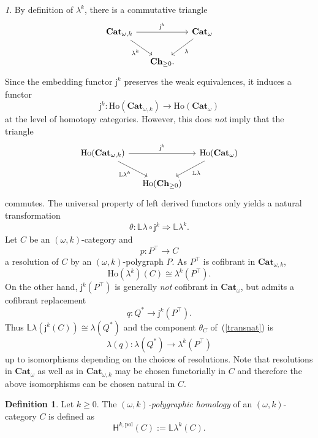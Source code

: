 \documentclass[reqno]{amsart}
\theoremstyle{plain}
\theoremstyle{definition}
\newtheorem{definition}[subsubsection]{Definition}
\theoremstyle{remark}
\newtheorem{paragr}[subsubsection]{} %
\newcommand{\pair}[2]{(#1,#2)}       %
\newcommand{\ctg}[1]{\mathbf{#1}}  %
\newcommand{\Cat}{\ctg{Cat}}   %
\newcommand{\nCat}[1]{\Cat_{#1}}  %
\newcommand{\opCat}[1]{\Cat_{\omega,#1}} %
\newcommand{\oCat}{\nCat{\omega}} %
\newcommand{\Ch}[1]{\ctg{Ch}_{#1}} %
\newcommand{\Chp}{\Ch{\geq 0}} %
\newcommand{\functor}[1]{\mathsf{#1}} %
\newcommand{\emb}[2]{\functor{j}_{#2}^{#1}}%
\newcommand{\oemb}[1]{\emb{#1}{}}%
\newcommand{\abel}{\functor{\lambda}} %
\newcommand{\abelk}[1]{\functor{\abel}^{#1}}%
\newcommand{\homnat}{\theta}%
\newcommand{\frcat}[1]{#1^*} %
\newcommand{\frgp}[1]{#1^\top} %
\newcommand{\ook}[1]{\ensuremath{\pair{\omega}{#1}}}
\newcommand{\Ho}{\functor{H}} %
\newcommand{\LL}{\mathbb{L}} %
\newcommand{\Hop}[1]{\Ho^{#1,\mathrm{pol}}} %
\newcommand{\Loc}[1]{\mathrm{Ho}(#1)} %
\newcommand{\nbd}{\nobreakdash} %
\begin{document}
\begin{paragr}\label{paragr:subtlety}
  By definition of $\abelk k$, there is a commutative triangle
  \[
    \begin{tikzcd}[column sep=small]
      \opCat{k}\ar[rr,"\oemb{k}"]\ar[rd,"\abelk{k}"']&& \oCat\ar[dl,"\abel"] \\
      &\Chp.&
  \end{tikzcd}
\]
Since the embedding functor $\oemb{k}$ preserves the weak
equivalences, it induces a functor
\[\oemb{k}\colon \Loc{\opCat{k}}\to  \Loc{\oCat}\]
at the level of homotopy categories. However, this does {\em not}
imply that the triangle
\[
  \begin{tikzcd}[column sep=small]
    \Loc{\opCat{k}}\ar[rr,"\oemb{k}"]\ar[rd,"\LL \abelk{k}"']&&
    \Loc{\oCat}\ar[dl,"\LL \abel"] \\
    &\Loc{\Chp}&
  \end{tikzcd}
\]
commutes. The universal property of left derived functors only yields a natural transformation
\begin{equation}\label{transnat}
  \homnat\colon\LL \abel\circ \oemb{k} \Rightarrow \LL \abelk{k}.
\end{equation}
Let $C$ be an \ook k-category and
\[
  p\colon\frgp P\to C
\]
a resolution of $C$ by an \ook k-polygraph $P$. As $\frgp P$ is
cofibrant in $\opCat k$,
\[
  \Loc{\abelk k}(C)\cong \abelk k(\frgp P).
  \]
On
the other hand, $\oemb{k}(\frgp P)$ is generally {\em not} cofibrant
in $\oCat$, but admits a cofibrant replacement
\[q\colon \frcat Q\to \oemb{k}(\frgp P).\]
Thus $\LL\abel(\oemb{k}(C))\cong \abel(\frcat Q)$ and the component
$\homnat_C$ of~(\ref{transnat}) is
\[\abel(q):\abel(\frcat Q)\to \abelk{k}(\frgp P)\]
up to isomorphisms depending on the choices of resolutions. Note that
resolutions in $\oCat$ as well as in $\opCat k$ may be chosen
functorially in $C$ and therefore the above isomorphisms can be chosen
natural in $C$. 
\end{paragr}
\begin{definition}\label{def:hompol}
  Let $k\geq 0$. The \emph{$\ook k$\nbd-polygraphic homology} of
  an \ook k\nbd-category $C$ is defined as
  \[
    \Hop{k}(C):=\LL \abelk{k} (C).
  \]
\end{definition}
\end{document}
